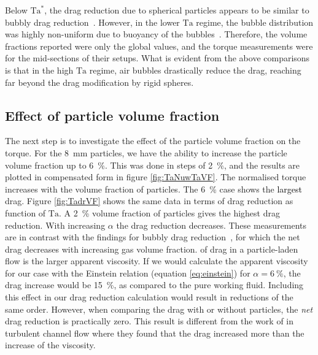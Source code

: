\documentclass{jfm}
\newcommand\Tay{\text{Ta}}
\newcommand{\red}[1]{\textcolor{black}{#1}}
\begin{document}
Below $\Tay^*$, the drag reduction due to spherical particles appears to be
similar to bubbly drag reduction~\citep{vanGils2013}. However, in the lower
$\Tay$ regime, the bubble distribution was highly non-uniform due to buoyancy
of the bubbles~\citep{vandenBerg2005,vanGils2013,Verschoof2016}. Therefore,
the volume fractions reported were only the global values, and the torque
measurements were for the mid-sections of their setups. What is evident from
the above comparisons is that in the high $\Tay$ regime, air bubbles
drastically reduce the drag, reaching far beyond the drag modification by
rigid spheres.


\subsection{Effect of particle volume fraction}\label{subsec:volumeFraction}
The next step is to investigate the effect of the particle volume fraction on
the torque. For the \SI{8}{\milli\metre} particles, we have the ability to
increase the particle volume fraction up to \SI{6}{\percent}. This was done in
steps of \SI{2}{\percent}, and the results are plotted in compensated form in
figure \ref{fig:TaNuwTaVF}. The normalised torque increases with the volume
fraction of particles. The \SI{6}{\percent} case shows the \red{largest} drag.
Figure \ref{fig:TadrVF} shows the same data in terms of drag reduction as
function of $\Tay$. A \SI{2}{\percent} volume fraction of particles gives the
highest drag reduction. With increasing $\alpha$ the drag reduction decreases.
These measurements are in contrast with the findings for bubbly drag
reduction~\citep{vanGils2013}, for which the net drag decreases with
increasing gas volume fraction.
of drag in a particle-laden flow is the larger apparent viscosity.  If we
would calculate the apparent viscosity for our case with the Einstein relation
(equation \ref{eq:einstein}) for $\alpha=\SI{6}{\percent}$, the drag increase
would be \SI{15}{\percent}, as compared to the pure working fluid.  Including
this effect in our drag reduction calculation would result in reductions of
the same order.  However, when comparing the drag with or without particles,
the \emph{net} drag reduction is practically zero.  This result is different
from the work of \cite{Picano2015} in turbulent channel flow where they found
that the drag increased more than the increase of the viscosity.
\end{document}
